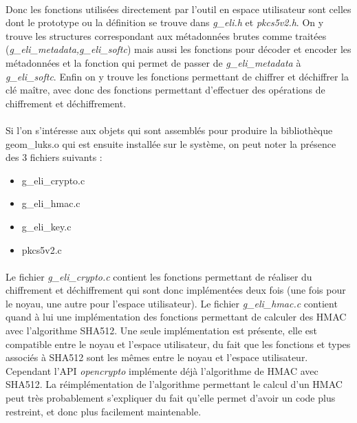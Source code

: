 \paragraph{}
Donc les fonctions utilisées directement par l'outil en espace utilisateur sont
celles dont le prototype ou la définition se trouve dans {\em g\_eli.h} et
{\em pkcs5v2.h}. On y trouve les structures correspondant aux métadonnées brutes
comme traitées ({\em g\_eli\_metadata,g\_eli\_softc}) mais aussi les fonctions
pour décoder et encoder les métadonnées et la fonction qui permet de passer de
{\em g\_eli\_metadata} à {\em g\_eli\_softc}. Enfin on y trouve les fonctions 
permettant de chiffrer et déchiffrer la clé maître, avec donc des fonctions
permettant d'effectuer des opérations de chiffrement et déchiffrement.


\paragraph{}
Si l'on s'intéresse aux objets qui sont assemblés pour produire la bibliothèque
geom\_luks.o qui est ensuite installée sur le système, on peut noter la présence
des 3 fichiers suivants :
\begin{itemize}
	\item g\_eli\_crypto.c
	\item g\_eli\_hmac.c
	\item g\_eli\_key.c
	\item pkcs5v2.c
\end{itemize}

\paragraph{}
Le fichier {\em g\_eli\_crypto.c} contient les fonctions permettant de réaliser
du chiffrement et déchiffrement qui sont donc implémentées deux fois (une fois
pour le noyau, une autre pour l'espace utilisateur). Le fichier
{\em g\_eli\_hmac.c} contient quand à lui une implémentation des fonctions
permettant de calculer des HMAC avec l'algorithme SHA512. Une seule implémentation
est présente, elle est compatible entre le noyau et l'espace utilisateur, du fait
que les fonctions et types associés à SHA512 sont les mêmes entre le noyau et
l'espace utilisateur.
Cependant l'API {\em opencrypto} implémente déjà l'algorithme de HMAC avec SHA512.
La réimplémentation de l'algorithme permettant le calcul d'un HMAC peut très
probablement s'expliquer du fait qu'elle permet d'avoir un code plus restreint,
et donc plus facilement maintenable.

